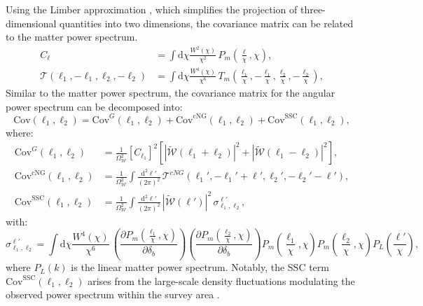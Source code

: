 Using the Limber approximation \citep{1954ApJ...119..655L}, which simplifies the projection of three-dimensional quantities into two dimensions, the covariance matrix can be related to the matter power spectrum. 
\begin{eqnarray}
    C_{\ell} &= \int \mathrm{d} \chi \frac{W^2(\chi)}{\chi^2} \,  P_m\left(\frac{\ell}{\chi}, \chi\right), \\
    \mathcal{T}(\boldsymbol{\ell}_1, -\boldsymbol{\ell}_1, \boldsymbol{\ell}_2, -\boldsymbol{\ell}_2) &= \int \mathrm{d} \chi \frac{W^4(\chi)}{\chi^6}  \, T_m\left(\frac{\boldsymbol{\ell}_1}{\chi}, -\frac{\boldsymbol{\ell}_1}{\chi}, \frac{\boldsymbol{\ell}_2}{\chi}, -\frac{\boldsymbol{\ell}_2}{\chi}\right),
\end{eqnarray}
Similar to the matter power spectrum, the covariance matrix for the angular power spectrum can be decomposed into:
\begin{equation}
    \mathrm{Cov}(\ell_1, \ell_2) = \mathrm{Cov}^{G}(\ell_1, \ell_2) + \mathrm{Cov}^{\text{cNG}}(\ell_1, \ell_2) + \mathrm{Cov}^{\mathrm{SSC}}(\ell_1, \ell_2),
\end{equation}
where:
\begin{align}
    \mathrm{Cov}^{G}(\ell_1, \ell_2) &= \frac{1}{\Omega_{\mathcal{W}}^2} \left[C_{\ell_1}\right]^2 \left[ \left|\tilde{\mathcal{W}}(\ell_1 + \ell_2)\right|^2 + \left|\tilde{\mathcal{W}}(\ell_1 - \ell_2)\right|^2 \right],\\
    \mathrm{Cov}^{\text{cNG}}(\ell_1, \ell_2) &= \frac{1}{\Omega_{\mathcal{W}}^2} \int \frac{\mathrm{d}^2 \ell'}{(2\pi)^2} \, \mathcal{T}^{cNG}(\boldsymbol{\ell}_1', -\boldsymbol{\ell}_1' + \boldsymbol{\ell}', \boldsymbol{\ell}_2', -\boldsymbol{\ell}_2' - \boldsymbol{\ell}'),\\
    \mathrm{Cov}^{\mathrm{SSC}}(\ell_1, \ell_2) &= \frac{1}{\Omega_{\mathcal{W}}^2} \int \frac{\mathrm{d}^2 \ell'}{(2\pi)^2} \, \left|\tilde{\mathcal{W}}(\ell')\right|^2 \, \sigma_{\ell_1, \ell_2}^{\ell'},
\end{align}
with:
\begin{equation}
    \sigma_{\ell_1, \ell_2}^{\ell'} = \int \mathrm{d} \chi \frac{W^4(\chi)}{\chi^6}  \, \left(\frac{\partial P_m\left(\frac{\ell_1}{\chi}, \chi\right)}{\partial \delta_b}\right) \left(\frac{\partial P_m\left(\frac{\ell_2}{\chi}, \chi\right)}{\partial \delta_b}\right) P_m\left(\frac{\ell_1}{\chi}, \chi\right) P_m\left(\frac{\ell_2}{\chi}, \chi\right) P_L\left(\frac{\ell'}{\chi}\right),
\end{equation}
where \( P_L(k) \) is the linear matter power spectrum.
Notably, the SSC term \( \mathrm{Cov}^{\mathrm{SSC}}(\ell_1, \ell_2) \) arises from the large-scale density fluctuations modulating the observed power spectrum within the survey area \citep{PhysRevD.87.123504}.

